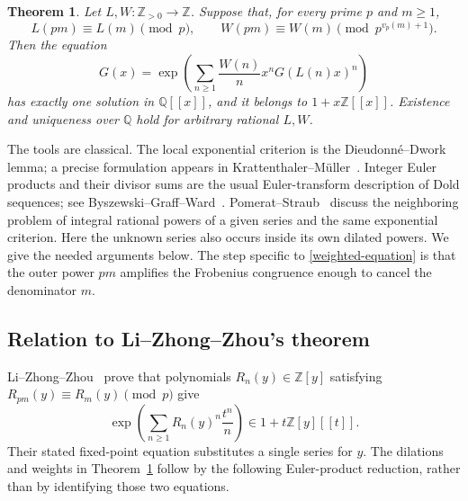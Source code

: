 \documentclass[11pt]{article}
\newtheorem{theorem}{Theorem}
\newcommand{\Z}{\mathbb Z}
\newcommand{\Q}{\mathbb Q}
\begin{document}
\begin{theorem}\label{weighted}
Let $L,W:\Z_{>0}\to\Z$. Suppose that, for every prime $p$ and $m\geq1$,
\begin{equation}\label{congruences}
 L(pm)\equiv L(m)\pmod p,
 \qquad W(pm)\equiv W(m)\pmod {p^{v_p(m)+1}}.
\end{equation}
Then the equation
\begin{equation}\label{weighted-equation}
 G(x)=\exp\left(\sum_{n\geq1}\frac{W(n)}{n}x^nG(L(n)x)^n\right)
\end{equation}
has exactly one solution in $\Q[[x]]$, and it belongs to $1+x\Z[[x]]$.
Existence and uniqueness over $\Q$ hold for arbitrary rational $L,W$.
\end{theorem}

The tools are classical. The local exponential criterion is the
Dieudonn\'e--Dwork lemma; a precise formulation appears in
Krattenthaler--M\"uller~\cite[Lemma 1]{km}. Integer Euler products and their
divisor sums are the usual Euler-transform description of Dold sequences;
see Byszewski--Graff--Ward~\cite[Theorem 2.5 and Lemma 2.6]{bgw}.
Pomerat--Straub~\cite[Theorem 1.1 and Corollary 4.2]{ps} discuss the
neighboring problem of integral rational powers of a given series and
the same exponential criterion. Here the unknown series also occurs
inside its own dilated powers. We give the needed arguments below. The step specific to
\eqref{weighted-equation} is that the outer power $pm$ amplifies the
Frobenius congruence enough to cancel the denominator $m$.

\subsection{Relation to Li--Zhong--Zhou's theorem}

Li--Zhong--Zhou~\cite[Theorem 1.2, equations (1.5)--(1.6),
and Section 5]{lzz} prove that polynomials $R_n(y)\in\Z[y]$ satisfying
$R_{pm}(y)\equiv R_m(y)\pmod p$ give
\[
 \exp\left(\sum_{n\geq1}R_n(y)^n\frac{t^n}{n}\right)
 \in1+t\Z[y][[t]].
\]
Their stated fixed-point equation substitutes a single series for $y$.
The dilations and weights in Theorem~\ref{weighted} follow by the following
Euler-product reduction, rather than by identifying those two equations.
\end{document}
